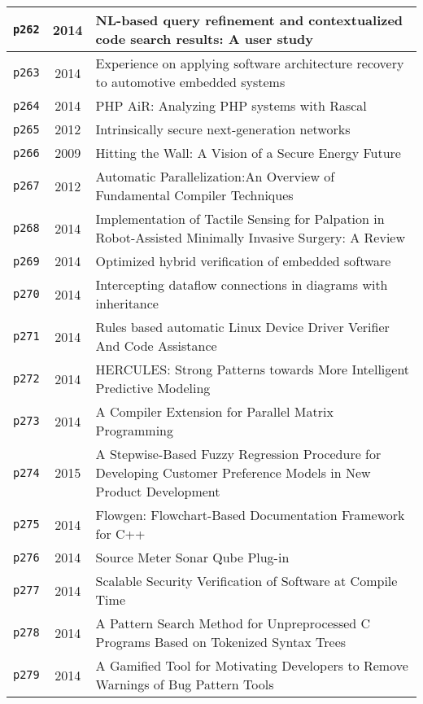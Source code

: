 \begin{longtable}{| c | c | p{16cm} |}
  \hline
  \texttt{p262} & 2014 & NL-based query refinement and contextualized code search results: A user study \\
  \hline
  \texttt{p263} & 2014 & Experience on applying software architecture recovery to automotive embedded systems \\
  \hline
  \texttt{p264} & 2014 & PHP AiR: Analyzing PHP systems with Rascal \\
  \hline
  \texttt{p265} & 2012 & Intrinsically secure next-generation networks \\
  \hline
  \texttt{p266} & 2009 & Hitting the Wall: A Vision of a Secure Energy Future \\
  \hline
  \texttt{p267} & 2012 & Automatic Parallelization:An Overview of Fundamental Compiler Techniques \\
  \hline
  \texttt{p268} & 2014 & Implementation of Tactile Sensing for Palpation in Robot-Assisted Minimally Invasive Surgery: A Review \\
  \hline
  \texttt{p269} & 2014 & Optimized hybrid verification of embedded software \\
  \hline
  \texttt{p270} & 2014 & Intercepting dataflow connections in diagrams with inheritance \\
  \hline
  \texttt{p271} & 2014 & Rules based automatic Linux Device Driver Verifier And Code Assistance \\
  \hline
  \texttt{p272} & 2014 & HERCULES: Strong Patterns towards More Intelligent Predictive Modeling \\
  \hline
  \texttt{p273} & 2014 & A Compiler Extension for Parallel Matrix Programming \\
  \hline
  \texttt{p274} & 2015 & A Stepwise-Based Fuzzy Regression Procedure for Developing Customer Preference Models in New Product Development \\
  \hline
  \texttt{p275} & 2014 & Flowgen: Flowchart-Based Documentation Framework for C++ \\
  \hline
  \texttt{p276} & 2014 & Source Meter Sonar Qube Plug-in \\
  \hline
  \texttt{p277} & 2014 & Scalable Security Verification of Software at Compile Time \\
  \hline
  \texttt{p278} & 2014 & A Pattern Search Method for Unpreprocessed C Programs Based on Tokenized Syntax Trees \\
  \hline
  \texttt{p279} & 2014 & A Gamified Tool for Motivating Developers to Remove Warnings of Bug Pattern Tools \\

\end{longtable}

